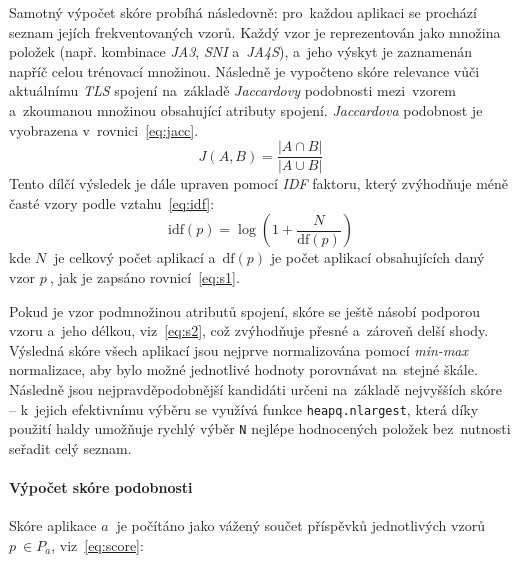 Samotný výpočet skóre probíhá následovně: pro~každou aplikaci se prochází seznam jejích frekventovaných vzorů. Každý vzor je reprezentován jako množina položek (např. kombinace \textit{JA3}, \textit{SNI} a~\textit{JA4S}), a~jeho výskyt je zaznamenán napříč celou trénovací množinou. Následně je vypočteno skóre relevance vůči aktuálnímu \textit{TLS} spojení na~základě \textit{Jaccardovy} podobnosti mezi~vzorem a~zkoumanou množinou obsahující atributy spojení. \textit{Jaccardova} podobnost je vyobrazena v~rovnici~\ref{eq:jacc}.
\begin{equation}
	J(A, B) = \frac{|A \cap B|}{|A \cup B|}
    \label{eq:jacc}
\end{equation}
Tento dílčí výsledek je dále upraven pomocí \textit{IDF} faktoru, který zvýhodňuje méně časté vzory podle vztahu~\ref{eq:idf}:
\begin{equation}
	\text{idf}(p) = \log\left(1 + \frac{N}{\text{df}(p)}\right)
    \label{eq:idf}
\end{equation}
kde \( N~\) je celkový počet aplikací a~\( \text{df}(p) \) je počet aplikací obsahujících daný vzor \( p~\), jak je zapsáno rovnicí~\ref{eq:s1}.

Pokud je vzor podmnožinou atributů spojení, skóre se ještě násobí podporou vzoru a~jeho délkou, viz~\ref{eq:s2}, což zvýhodňuje přesné a~zároveň delší shody. Výsledná skóre všech aplikací jsou nejprve normalizována pomocí \textit{min-max} normalizace, aby bylo možné jednotlivé hodnoty porovnávat na~stejné škále. Následně jsou nejpravděpodobnější kandidáti určeni na~základě nejvyšších skóre -- k~jejich efektivnímu výběru se využívá funkce \texttt{heapq.nlargest}, která díky použití haldy umožňuje rychlý výběr \texttt{N} nejlépe hodnocených položek bez~nutnosti seřadit celý seznam. 


\paragraph{Výpočet skóre podobnosti}

Skóre aplikace \( a~\) je počítáno jako vážený součet příspěvků jednotlivých vzorů \( p~\in P_a \), viz~\ref{eq:score}:


